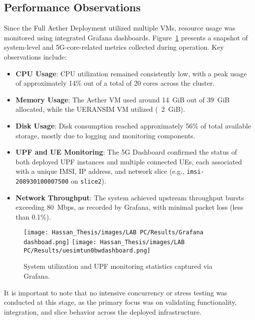 \subsection{Performance Observations}
\label{ssec:fullAether-perf}

Since the Full Aether Deployment utilized multiple VMs, resource usage was monitored using integrated Grafana dashboards. Figure~\ref{fig:system-utilization-stats} presents a snapshot of system-level and 5G-core-related metrics collected during operation. Key observations include:

\begin{itemize}
    \item \textbf{CPU Usage}: CPU utilization remained consistently low, with a peak usage of approximately 14\% out of a total of 20 cores across the cluster.
    \item \textbf{Memory Usage}: The Aether VM used around 14~GiB out of 39~GiB allocated, while the UERANSIM VM utilized (~2~GiB).
    \item \textbf{Disk Usage}: Disk consumption reached approximately 56\% of total available storage, mostly due to logging and monitoring components.
    \item \textbf{UPF and UE Monitoring}: The 5G Dashboard confirmed the status of both deployed UPF instances and multiple connected UEs, each associated with a unique IMSI, IP address, and network slice (e.g., \texttt{imsi-208930100007500} on \texttt{slice2}).
    \item \textbf{Network Throughput}: The system achieved upstream throughput bursts exceeding 80~Mbps, as recorded by Grafana, with minimal packet loss (less than 0.1\%).
\end{itemize}

\begin{figure}[H]
    \centering
    \texttt{[image: Hassan\_Thesis/images/LAB PC/Results/Grafana dashboad.png]}
    \texttt{[image: Hassan\_Thesis/images/LAB PC/Results/uesimtun0bwdashboard.png]}
    \caption{System utilization and UPF monitoring statistics captured via Grafana.}
    \label{fig:system-utilization-stats}
\end{figure}

It is important to note that no intensive concurrency or stress testing was conducted at this stage, as the primary focus was on validating functionality, integration, and slice behavior across the deployed infrastructure.



